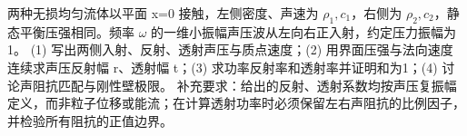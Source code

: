 两种无损均匀流体以平面 x=0 接触，左侧密度、声速为 \(\rho_1,c_1\)，右侧为 \(\rho_2,c_2\)，静态平衡压强相同。频率 \(\omega \) 的一维小振幅声压波从左向右正入射，约定压力振幅为1。
(1) 写出两侧入射、反射、透射声压与质点速度；(2) 用界面压强与法向速度连续求声压反射幅 r、透射幅 t；(3) 求功率反射率和透射率并证明和为1；(4) 讨论声阻抗匹配与刚性壁极限。
补充要求：给出的反射、透射系数均按声压复振幅定义，而非粒子位移或能流；在计算透射功率时必须保留左右声阻抗的比例因子，并检验所有阻抗的正值边界。
